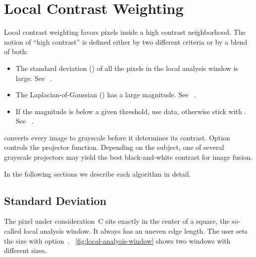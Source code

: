 

\section[Local Contrast Weighting]{\label{sec:local-contrast-weighting}%
  Local Contrast Weighting}

Local contrast weighting favors pixels inside a high contrast neighborhood.  The notion of
``high contrast'' is defined either by two different criteria or by a blend of both:

\begin{itemize}
\item
  The standard deviation () of all the pixels in the local analysis window is
  large.  See \sectionName~.

\item
  The Laplacian-of-Gaussian () has a large magnitude.  See
  \sectionName~.

\item
  If the  magnitude is below a given threshold, use  data, otherwise
  stick with .  See \sectionName~.
\end{itemize}

\App{} converts every  image to grayscale before it determines its contrast.
Option~ controls the projector
function.  Depending on the subject, one of several grayscale projectors may yield the best
black-and-white contrast for image fusion.

In the following sections we describe each algorithm in detail.


\subsection[Standard Deviation]{\label{sec:standard-deviation}%
  Standard Deviation}

%
%
The pixel under consideration~\textsf{C} sits exactly in the center of a square, the so-called
local analysis window.  It always has an uneven edge length.  The user sets the size with
option~.  \figureName~\ref{fig:local-analysis-window} shows two
windows with different sizes.


